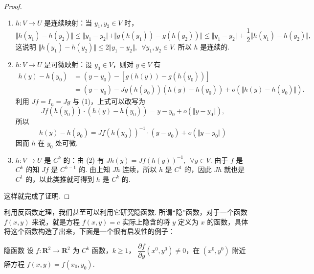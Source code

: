 \begin{proof}
    \begin{enumerate}[label=(\arabic*)]
        \item $h \colon V\to U$ 是连续映射：当 $y_1,y_2\in V$ 时，\[\Vert h(y_1) - h(y_2)\Vert \leqslant \Vert y_1 - y_2 \Vert +\Vert g(h(y_1)) - g(h(y_2))\Vert \leqslant \Vert y_1 - y_2\Vert + \frac{1}{2}\Vert h(y_1) - h(y_2)\Vert,\]
              这说明 $\Vert h(y_1) - h(y_2)\Vert \leqslant 2\Vert y_1 - y_2\Vert,\enspace \forall y_1, y_2\in V$. 所以 $h$ 是连续的.
        \item $h \colon V\to U$ 是可微映射：设 $y_0\in V$，则对 $y\in V$ 有
              \begin{align}
                  h(y) - h(y_0) & = (y - y_0) - [g(h(y)) - g(h(y_0))]                                    \\
                                & = (y - y_0) - Jg(h(y_0))(h(y) - h(y_0)) + o(\Vert h(y) - h(y_0)\Vert).
              \end{align}
              利用 $Jf = I_n = Jg$ 与 (1)，上式可以改写为\[Jf(h(y_0))\cdot(h(y) - h(y_0)) = y - y_0 + o(\Vert y - y_0\Vert),\]
              所以 \[h(y) - h(y_0) = Jf(h(y_0))^{-1}\cdot(y - y_0) + o(\Vert y - y_0\Vert)\]
              因而 $h$ 在 $y_0$ 处可微.
        \item $h \colon V\to U$ 是 $C^k$ 的：由 (2) 有 $Jh(y) = Jf(h(y))^{-1},\enspace \forall y\in V$. 由于 $f$ 是 $C^k$ 的知 $Jf$ 是 $C^{k-1}$ 的. 由上知 $Jh$ 连续，所以 $h$ 是 $C^1$ 的，因此 $Jh$ 就也是 $C^1$ 的，以此类推就可得到 $h$ 是 $C^k$ 的.
    \end{enumerate}

    这样就完成了证明.
\end{proof}

利用反函数定理，我们甚至可以利用它研究隐函数. 所谓``隐''函数，对于一个函数 $f(x, y)$ 来说，就是方程 $f(x, y) = c$ 实际上隐含的将 $y$ 定义为 $x$ 的函数，具体将这个函数构造了出来，下面是一个很有启发性的例子：

\begin{example}{}{隐函数}
    设 $f\colon\mathbf{R}^2\to\mathbf{R}^2$ 为 $C^{k}$ 函数，$k\geqslant 1$， $\dfrac{\partial f}{\partial y}(x^0, y^0)\neq 0$，在 $(x^0, y^0)$ 附近解方程 $f(x, y) = f(x_0, y_0)$.
\end{example}

